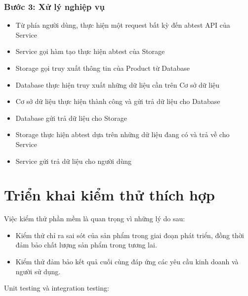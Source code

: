 \subsubsection{Bước 3: Xử lý nghiệp vụ}

\begin{itemize}
	\item Từ phía người dùng, thực hiện một request bất kỳ đến abtest API của Service
	\item Service gọi hàm tạo thực hiện abtest của Storage
	\item Storage gọi truy xuất thông tin của Product từ Database
	\item Database thực hiện truy xuất những dữ liệu cần trên Cơ sở dữ liệu
	\item Cơ sở dữ liệu thực hiện thành công và gửi trả dữ liệu cho Database
	\item Database gửi trả dữ liệu cho Storage
	\item Storage thực hiện abtest dựa trên những dữ liệu đang có và trả về cho Service
	\item Service gửi trả dữ liệu cho người dùng
\end{itemize}

\section{Triển khai kiểm thử thích hợp}

Việc kiểm thử phần mềm là quan trọng vì những lý do sau:

\begin{itemize}
	\item Kiểm thử chỉ ra sai sót của sản phẩm trong giai đoạn phát triển, đồng thời đảm bảo chất lượng sản phẩm trong tương lai.
	\item Kiểm thử đảm bảo kết quả cuối cùng đáp ứng các yêu cầu kinh doanh và người sử dụng.
\end{itemize}

Unit testing và integration testing:

